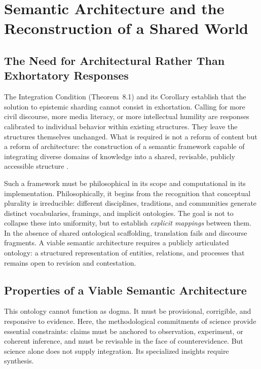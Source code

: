 \documentclass[12pt]{article}
\theoremstyle{definition}
\theoremstyle{plain}
\begin{document}
\section{Semantic Architecture and the Reconstruction of a Shared World}
\label{sec:architecture}

\subsection{The Need for Architectural Rather Than Exhortatory Responses}

The Integration Condition (Theorem~8.1) and its Corollary establish that the solution to epistemic sharding cannot consist in exhortation. Calling for more civil discourse, more media literacy, or more intellectual humility are responses calibrated to individual behavior within existing structures. They leave the structures themselves unchanged. What is required is not a reform of content but a reform of architecture: the construction of a semantic framework capable of integrating diverse domains of knowledge into a shared, revisable, publicly accessible structure \citep{Berners-Lee2001}.

Such a framework must be philosophical in its scope and computational in its implementation. Philosophically, it begins from the recognition that conceptual plurality is irreducible: different disciplines, traditions, and communities generate distinct vocabularies, framings, and implicit ontologies. The goal is not to collapse these into uniformity, but to establish \emph{explicit mappings} between them. In the absence of shared ontological scaffolding, translation fails and discourse fragments. A viable semantic architecture requires a publicly articulated ontology: a structured representation of entities, relations, and processes that remains open to revision and contestation.

\subsection{Properties of a Viable Semantic Architecture}

This ontology cannot function as dogma. It must be provisional, corrigible, and responsive to evidence. Here, the methodological commitments of science provide essential constraints: claims must be anchored to observation, experiment, or coherent inference, and must be revisable in the face of counterevidence. But science alone does not supply integration. Its specialized insights require synthesis.
\end{document}
